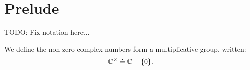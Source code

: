 
\section{Prelude} %
\label{sec:purelude}
TODO: Fix notation here...

We define the non-zero complex numbers form a multiplicative group, written:
\[
\mathbb{C}^{\times} \doteq \mathbb{C} - \{0\}.
\]
